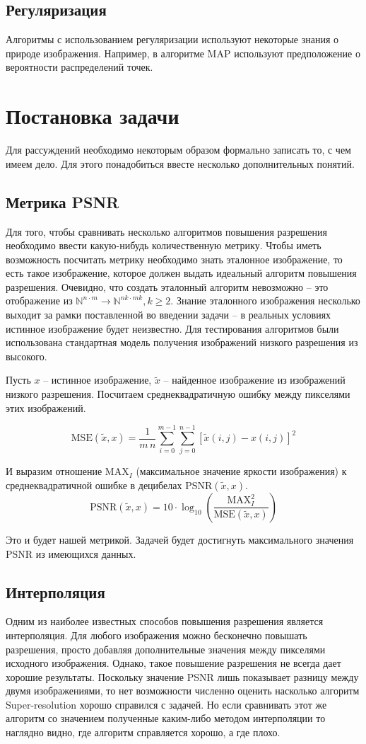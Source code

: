 \subsection{Регуляризация} Алгоритмы с использованием регуляризации используют некоторые знания о природе изображения.
Например, в алгоритме MAP используют предположение о вероятности распределений точек.

\section{Постановка задачи}
Для рассуждений необходимо некоторым образом формально записать то, с чем имеем дело. Для этого понадобиться ввесте
несколько дополнительных понятий.

\subsection{Метрика PSNR}
Для того, чтобы сравнивать несколько алгоритмов повышения разрешения необходимо ввести какую-нибудь количественную
метрику. Чтобы иметь возможность посчитать метрику необходимо знать эталонное изображение, то есть такое изображение,
которое должен выдать идеальный алгоритм повышения разрешения. Очевидно, что создать эталонный алгоритм невозможно --
это отображение из $\mathbb{N}^{n \cdot m } \to \mathbb{N}^{nk \cdot mk}, k \ge 2$. Знание эталонного изображения
несколько выходит за рамки поставленной во введении задачи -- в реальных условиях истинное изображение будет неизвестно.
Для тестирования алгоритмов были использована стандартная модель получения изображений низкого разрешения из высокого.

Пусть $x$ -- истинное изображение, $\tilde{x}$ -- найденное изображение из изображений низкого разрешения. Посчитаем
среднеквадратичную ошибку между пикселями этих изображений.

$$ \mathrm{MSE}(\tilde{x},x) = \frac{1}{m\,n}\sum_{i=0}^{m-1}\sum_{j=0}^{n-1} [\tilde{x}(i,j) - x(i,j)]^2$$

И выразим отношение $\mathrm{MAX}_I$ (максимальное значение яркости изображения) к среднеквадратичной ошибке в
децибелах
$\mathrm{PSNR}(\tilde{x},x)$.
$$ \mathrm{PSNR}(\tilde{x},x) = 10 \cdot \log_{10} \left( \frac{\mathrm{MAX}_I^2}{\mathrm{MSE}(\tilde{x},x)} \right) $$

Это и будет нашей метрикой. Задачей будет достигнуть максимального значения PSNR из имеющихся данных.

\subsection{Интерполяция}
Одним из наиболее известных способов повышения разрешения является интерполяция. Для любого изображения можно бесконечно
повышать разрешения, просто добавляя дополнительные значения между пикселями исходного изображения. Однако, такое
повышение разрешения не всегда дает хорошие результаты. Поскольку значение PSNR лишь показывает разницу между двумя
изображениями, то нет возможности численно оценить насколько алгоритм Super-resolution хорошо справился с задачей. Но
если сравнивать этот же алгоритм со значением полученные каким-либо методом интерполяции то наглядно видно, где алгоритм
справляется хорошо, а где плохо.

